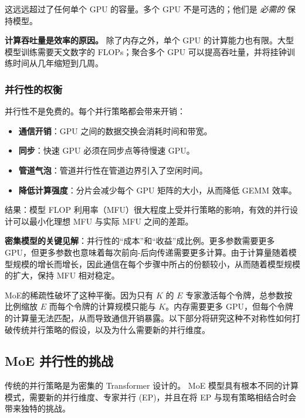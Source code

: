 \documentclass[10pt,logo,copyright]{nvidiatechreport_zh}
\begin{document}
这远远超过了任何单个 GPU 的容量。多个 GPU 不是可选的；他们是 \emph{必需的} 保持模型。

\textbf{计算吞吐量是效率的原因。} 除了内存之外，单个 GPU 的计算能力也有限。大型模型训练需要天文数字的 FLOPs；聚合多个 GPU 可以提高吞吐量，并将挂钟训练时间从几年缩短到几周。

\subsubsection{并行性的权衡}

并行性不是免费的。每个并行策略都会带来开销：

\begin{itemize}
    \item \textbf{通信开销}：GPU 之间的数据交换会消耗时间和带宽。
    \item \textbf{同步}：快速 GPU 必须在同步点等待慢速 GPU。
    \item \textbf{管道气泡}：管道并行性在管道边界引入了空闲时间。
    \item \textbf{降低计算强度}：分片会减少每个 GPU 矩阵的大小，从而降低 GEMM 效率。
\end{itemize}

结果：模型 FLOP 利用率（MFU）很大程度上受并行策略的影响，有效的并行设计可以最小化理想 MFU 与实际 MFU 之间的差距。

\textbf{密集模型的关键见解}：并行性的“成本”和“收益”成比例。更多参数需要更多 GPU，但更多参数也意味着每次前向-后向传递需要更多计算。由于计算量随着模型规模的增长而增长，因此通信在每个步骤中所占的份额较小，从而随着模型规模的扩大，保持 MFU 相对稳定。

MoE的稀疏性破坏了这种平衡。因为只有 $K$ 的 $E$ 专家激活每个令牌，总参数按比例缩放 $E$ 而每个令牌的计算规模只能与 $K$。内存需要更多 GPU，但每个令牌的计算量无法匹配，从而导致通信开销暴露。以下部分将研究这种不对称性如何打破传统并行策略的假设，以及为什么需要新的并行维度。

\subsection{MoE 并行性的挑战}\label{sec:moe-parallelism-challenge}

传统的并行策略是为密集的 Transformer 设计的。 MoE 模型具有根本不同的计算模式，需要新的并行维度、专家并行 (EP)，并且在将 EP 与现有策略相结合时会带来独特的挑战。
\end{document}
